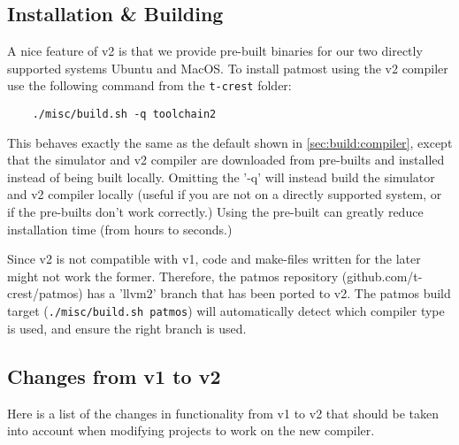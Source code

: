 \subsection{Installation \& Building}

A nice feature of v2 is that we provide pre-built binaries for our two directly supported systems Ubuntu and MacOS.
To install patmost using the v2 compiler use the following command from the \texttt{t-crest} folder:

\begin{verbatim}
	./misc/build.sh -q toolchain2
\end{verbatim}

This behaves exactly the same as the default shown in \autoref{sec:build:compiler}, except that the simulator and v2 compiler are downloaded from pre-builts and installed instead of being built locally.
Omitting the '-q' will instead build the simulator and v2 compiler locally (useful if you are not on a directly supported system, or if the pre-builts don't work correctly.)
Using the pre-built can greatly reduce installation time (from hours to seconds.)

Since v2 is not compatible with v1, code and make-files written for the later might not work the former.
Therefore, the patmos repository (github.com/t-crest/patmos) has a 'llvm2' branch that has been ported to v2.
The patmos build target (\texttt{./misc/build.sh patmos}) will automatically detect which compiler type is used, and ensure the right branch is used.

\subsection{Changes from v1 to v2}

Here is a list of the changes in functionality from v1 to v2 that should be taken into account when modifying projects to work on the new compiler.

